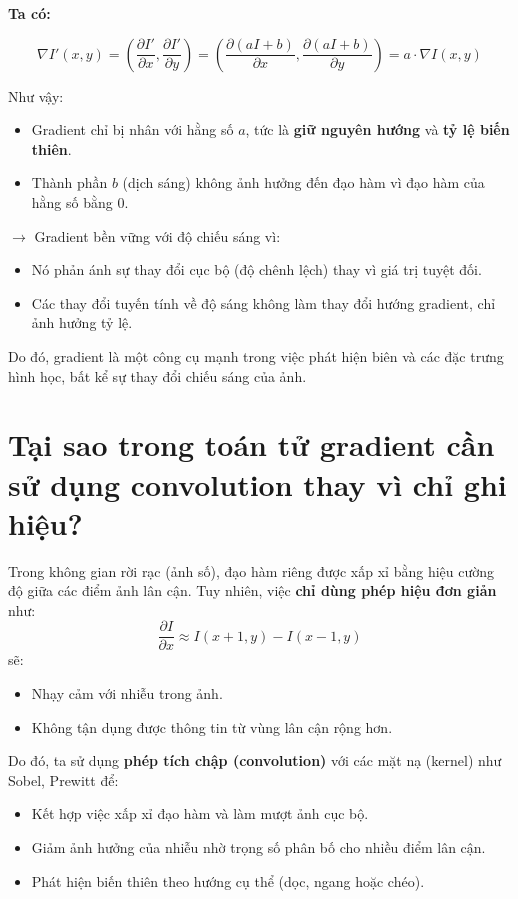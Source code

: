 \documentclass[12pt]{article}
\begin{document}
	\textbf{Ta có:}
	
	\[
	\nabla I'(x, y) = \left( \frac{\partial I'}{\partial x}, \frac{\partial I'}{\partial y} \right)
	= \left( \frac{\partial (aI + b)}{\partial x}, \frac{\partial (aI + b)}{\partial y} \right)
	= a \cdot \nabla I(x, y)
	\]
	
	Như vậy:
	\begin{itemize}
	\item Gradient chỉ bị nhân với hằng số $a$, tức là \textbf{giữ nguyên hướng} và \textbf{tỷ lệ biến thiên}.
	\item Thành phần $b$ (dịch sáng) không ảnh hưởng đến đạo hàm vì đạo hàm của hằng số bằng 0.
	\end{itemize}
	
	$\rightarrow$ Gradient bền vững với độ chiếu sáng vì:
	\begin{itemize}
	\item Nó phản ánh sự thay đổi cục bộ (độ chênh lệch) thay vì giá trị tuyệt đối.
	\item Các thay đổi tuyến tính về độ sáng không làm thay đổi hướng gradient, chỉ ảnh hưởng tỷ lệ.
	\end{itemize}
	
	Do đó, gradient là một công cụ mạnh trong việc phát hiện biên và các đặc trưng hình học, bất kể sự thay đổi chiếu sáng của ảnh.
	
	\section{Tại sao trong toán tử gradient cần sử dụng convolution thay vì chỉ ghi hiệu?}
	
	Trong không gian rời rạc (ảnh số), đạo hàm riêng được xấp xỉ bằng hiệu cường độ giữa các điểm ảnh lân cận. Tuy nhiên, việc \textbf{chỉ dùng phép hiệu đơn giản} như:
	\[
	\frac{\partial I}{\partial x} \approx I(x+1, y) - I(x-1, y)
	\]
	sẽ:
	\begin{itemize}
	\item Nhạy cảm với nhiễu trong ảnh.
	\item Không tận dụng được thông tin từ vùng lân cận rộng hơn.
	\end{itemize}
	
	Do đó, ta sử dụng \textbf{phép tích chập (convolution)} với các mặt nạ (kernel) như Sobel, Prewitt để:
	\begin{itemize}
	\item Kết hợp việc xấp xỉ đạo hàm và làm mượt ảnh cục bộ.
	\item Giảm ảnh hưởng của nhiễu nhờ trọng số phân bố cho nhiều điểm lân cận.
	\item Phát hiện biến thiên theo hướng cụ thể (dọc, ngang hoặc chéo).
	\end{itemize}
	
\end{document}
